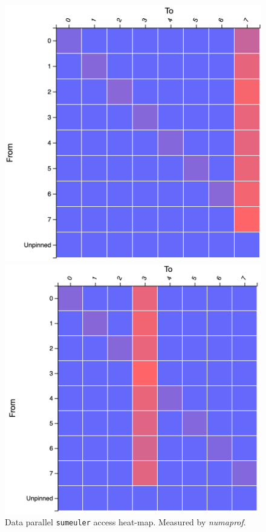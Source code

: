 \documentclass{paper}\usepackage{graphicx}
\begin{document}
\begin{figure}[!htb]
    \centering
    \begin{multicols}{3}
    \caption{DNC \lstinline{sumeuler} access heat-map. Measured by \textit{numaprof}.}
    \label{fig:access_divConq}
    \includegraphics[width=\linewidth]{Paper/images/sumeuler/divconq_access.png}\par
    \caption{Data parallel \lstinline{sumeuler} access heat-map. Measured by \textit{numaprof}.}
    \label{fig:access_dp}
    \includegraphics[width=\linewidth]{Paper/images/sumeuler/dp_access.png}\par

\end{multicols}
\end{figure}
\end{document}
